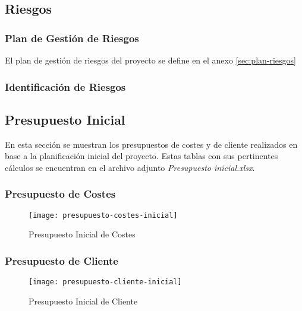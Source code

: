 \subsection{Riesgos}\label{sec:riesgos}

\subsubsection{Plan de Gestión de Riesgos} 
El plan de gestión de riesgos del proyecto se define en el anexo \ref{sec:plan-riesgos}

\subsubsection{Identificación de Riesgos}




\subsection{Presupuesto Inicial}
En esta sección se muestran los presupuestos de costes y de cliente realizados en base a la planificación inicial del proyecto. Estas tablas con sus pertinentes cálculos se encuentran en el archivo adjunto \textit{Presupuesto inicial.xlsx}.
\subsubsection{Presupuesto de Costes}
\begin{figure}[H]
\centering
\centerline{\texttt{[image: presupuesto-costes-inicial]}}
\caption{Presupuesto Inicial de Costes}
\end{figure} 

\subsubsection{Presupuesto de Cliente} 
\begin{figure}[H]
\centering
\centerline{\texttt{[image: presupuesto-cliente-inicial]}}
\caption{Presupuesto Inicial de Cliente}
\end{figure} 


%
%
%


